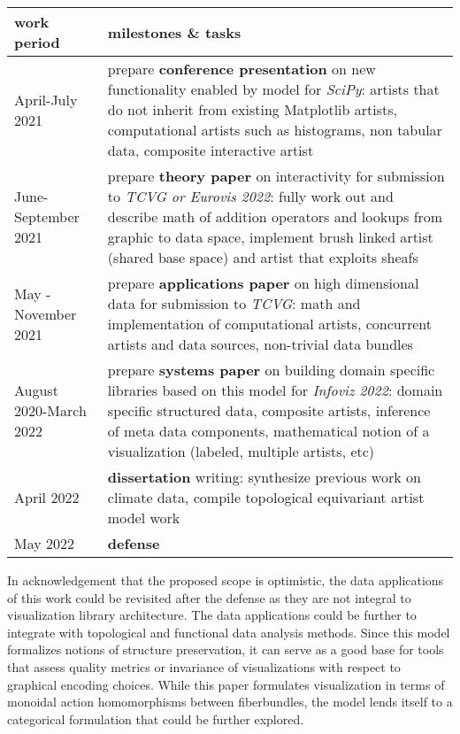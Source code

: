 \documentclass[../main.tex]{subfiles}
\begin{document}
\begin{table}[H]
    \centering
    \renewcommand{\arraystretch}{2}
    \begin{tabulary}{\textwidth}{|l|L|}\hline
    \textbf{work period} & \textbf{milestones \& tasks} \\ \hline
    April-July 2021 & prepare \textbf{conference presentation} on new functionality enabled by model for \textit{SciPy}: artists that do not inherit from existing Matplotlib artists, computational artists such as histograms, non tabular data, composite interactive artist \\ \hline
    June-September 2021  & prepare \textbf{theory paper} on interactivity for submission to \textit{TCVG or Eurovis 2022}: fully work out and describe math of addition operators and lookups from graphic to data space, implement brush linked artist (shared base space) and artist that exploits sheafs \\ \hline
    May - November 2021 & prepare \textbf{applications paper} on high dimensional data for submission to \textit{TCVG}: math and implementation of computational artists, concurrent artists and data sources, non-trivial data bundles \\ \hline 
    August 2020-March 2022 & prepare \textbf{systems paper} on building domain specific libraries based on this model for \textit{Infoviz 2022}: domain specific structured data, composite artists, inference of meta data components, mathematical notion of a visualization (labeled, multiple artists, etc)\\ \hline
    April 2022 & \textbf{dissertation} writing: synthesize previous work on climate data, compile topological equivariant artist model work \\ \hline
    May 2022 & \textbf{defense} \\ \hline
    \end{tabulary}
    \caption{}
    \label{tab:code:schedule}
\end{table}
In acknowledgement that the proposed scope is optimistic, the data applications of this work could be revisited after the defense as they are not integral to visualization library architecture. The data applications could be further to integrate with topological\cite{heineSurveyTopologybasedMethods2016} and functional \cite{ramsayFunctionalDataAnalysis2006a} data analysis methods. Since this model formalizes notions of structure preservation, it can serve as a good base for tools that assess quality metrics\cite{bertiniQualityMetricsHighdimensional2011a} or invariance \cite{kindlmannAlgebraicProcessVisualization2014} of visualizations with respect to graphical encoding choices. While this paper formulates visualization in terms of monoidal action homomorphisms between fiberbundles, the model lends itself to a categorical formulation\cite{fongInvitationAppliedCategory2019,milewskiCategoryTheoryProgrammers} that could be further explored. 
  
\end{document}
